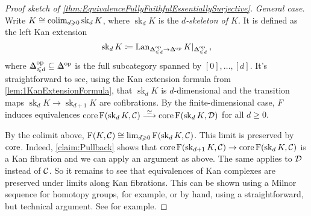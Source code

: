 \begin{proof}[Proof sketch of \cref{thm:EquivalenceFullyFaithfulEssentiallySurjective}]
	\emph{General case.} Write $K\cong \operatorname*{colim}_{d\geqslant 0}\operatorname{sk}_dK$, where $\operatorname{sk}_dK$ is the \emph{$d$-skeleton of $K$}. It is defined as the left Kan extension 
	\begin{equation*}
		\operatorname{sk}_dK\coloneqq \Lan_{\IDelta_{\leqslant d}^\op\rightarrow\IDelta^\op}K|_{\IDelta_{\leqslant d}^\op}\,,
	\end{equation*}
	where $\IDelta_{\leqslant d}^\op\subseteq\IDelta^\op$ is the full subcategory spanned by $[0],\dotsc,[d]$. It's straightforward to see, using the Kan extension formula from \cref{lem:1KanExtensionFormula}, that $\operatorname{sk}_dK$ is $d$-dimensional and the transition maps $\operatorname{sk}_dK\rightarrow\operatorname{sk}_{d+1}K$ are cofibrations. By the finite-dimensional case, $F$ induces equivalences $\operatorname{core} \operatorname{F}(\operatorname{sk}_dK,\mathcal{C})\overset{\simeq}{\longrightarrow}\operatorname{core}\operatorname{F}(\operatorname{sk}_dK,\mathcal{D})$ for all $d\geqslant 0$.
	
	By the colimit above, $\operatorname{F}(K,\mathcal{C})\cong\operatorname*{lim}_{d\geqslant 0}\operatorname{F}(\operatorname{sk}_dK,\mathcal{C})$. This limit is preserved by $\operatorname{core}$. Indeed, \cref{claim:Pullback} shows that $\operatorname{core} \operatorname{F}(\operatorname{sk}_{d+1}K,\mathcal{C})\rightarrow \operatorname{core} \operatorname{F}(\operatorname{sk}_dK,\mathcal{C})$ is a Kan fibration and we can apply an argument as above. The same applies to $\mathcal{D}$ instead of $\mathcal{C}$. So it remains to see that equivalences of Kan complexes are preserved under limits along Kan fibrations. This can be shown using a Milnor sequence for homotopy groups, for example, or by hand, using a straightforward, but technical argument. See \cite[Lemma~VII.12]{HigherCatsI} for example.
\end{proof}

